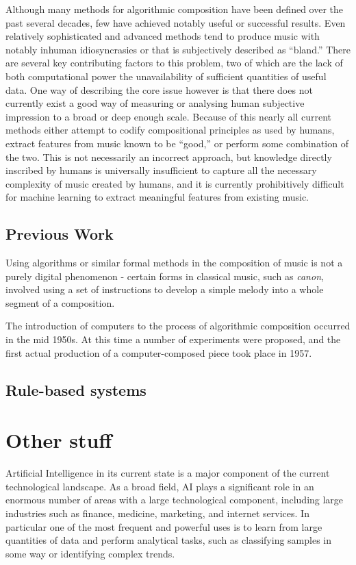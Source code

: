 \documentclass[ author={Stephen Livermore-Tozer},
				supervisor={Dr. Peter Flach},
				degree={MEng},
				title={Performing Algorithmic Co-composition Using Machine Learning},
				subtitle={},
				type={research},
				year={2016} ]{dissertation}
\begin{document}
	Although many methods for algorithmic composition have been defined over the past several decades, few have achieved notably useful or successful results. Even relatively sophisticated and advanced methods tend to produce music with notably inhuman idiosyncrasies or that is subjectively described as ``bland.'' There are several key contributing factors to this problem, two of which are the lack of both computational power the unavailability of sufficient quantities of useful data. One way of describing the core issue however is that there does not currently exist a good way of measuring or analysing human subjective impression to a broad or deep enough scale. Because of this nearly all current methods either attempt to codify compositional principles as used by humans, extract features from music known to be ``good,'' or perform some combination of the two. This is not necessarily an incorrect approach, but knowledge directly inscribed by humans is universally insufficient to capture all the necessary complexity of music created by humans, and it is currently prohibitively difficult for machine learning to extract meaningful features from existing music.
	
	\subsection{Previous Work}
	
	Using algorithms or similar formal methods in the composition of music is not a purely digital phenomenon - certain forms in classical music, such as \textit{canon}, involved using a set of instructions to develop a simple melody into a whole segment of a composition. 
	
	The introduction of computers to the process of algorithmic composition occurred in the mid 1950s. At this time a number of experiments were proposed, and the first actual production of a computer-composed piece took place in 1957.
	
	\subsection{Rule-based systems}
	
	\section{Other stuff}
	
	Artificial Intelligence in its current state is a major component of the current technological landscape. As a broad field, AI plays a significant role in an enormous number of areas with a large technological component, including large industries such as finance, medicine, marketing, and internet services. In particular one of the most frequent and powerful uses is to learn from large quantities of data and perform analytical tasks, such as classifying samples in some way or identifying complex trends. 
	
\end{document}
